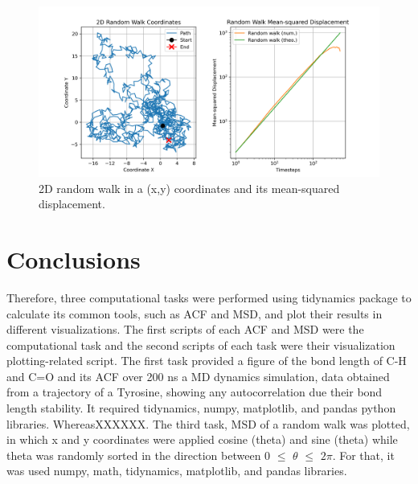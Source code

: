 \documentclass{article}
\begin{document}
\begin{figure}[H]
\centering
\includegraphics[width=\linewidth]{msd_plot.png}
\caption{2D random walk in a (x,y) coordinates and its mean-squared displacement.}
\label{fig:msd_plot}
\end{figure}

\section{Conclusions}

Therefore, three computational tasks were performed using tidynamics package to calculate its common tools, such as ACF and MSD, and plot their results in different visualizations. The first scripts of each ACF and MSD were the computational task and the second scripts of each task were their visualization plotting-related script. The first task provided a figure of the bond length of C-H and C=O and its ACF over 200 ns a MD dynamics simulation, data obtained from a trajectory of a Tyrosine, showing any autocorrelation due their bond length stability. It required tidynamics, numpy, matplotlib, and pandas python libraries. WhereasXXXXXX. The third task, MSD of a random walk was plotted, in which x and y coordinates were applied cosine (theta) and sine (theta) while theta was randomly sorted in the direction between 0 $\leq$ $\theta$ $\leq$ $2\pi$. For that, it was used numpy, math, tidynamics, matplotlib, and pandas libraries.



\end{document}
